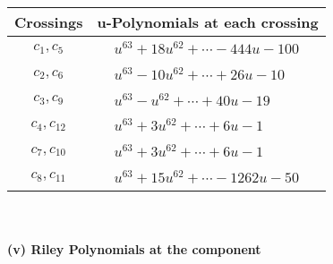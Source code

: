 \documentclass[1p]{elsarticle_modified}
\theoremstyle{definition}
\begin{document}
\begin{tabular}{m{50pt}|m{274pt}}
Crossings & \hspace{64pt}u-Polynomials at each crossing \\
\hline $$\begin{aligned}c_{1},c_{5}\end{aligned}$$&$\begin{aligned}
&u^{63}+18 u^{62}+\cdots-444 u-100
\end{aligned}$\\
\hline $$\begin{aligned}c_{2},c_{6}\end{aligned}$$&$\begin{aligned}
&u^{63}-10 u^{62}+\cdots+26 u-10
\end{aligned}$\\
\hline $$\begin{aligned}c_{3},c_{9}\end{aligned}$$&$\begin{aligned}
&u^{63}- u^{62}+\cdots+40 u-19
\end{aligned}$\\
\hline $$\begin{aligned}c_{4},c_{12}\end{aligned}$$&$\begin{aligned}
&u^{63}+3 u^{62}+\cdots+6 u-1
\end{aligned}$\\
\hline $$\begin{aligned}c_{7},c_{10}\end{aligned}$$&$\begin{aligned}
&u^{63}+3 u^{62}+\cdots+6 u-1
\end{aligned}$\\
\hline $$\begin{aligned}c_{8},c_{11}\end{aligned}$$&$\begin{aligned}
&u^{63}+15 u^{62}+\cdots-1262 u-50
\end{aligned}$\\
\hline
\end{tabular}\\~\\
\newpage\renewcommand{\arraystretch}{1}
\flushleft \textbf{(v) Riley Polynomials at the component}\newline \\
\end{document}
